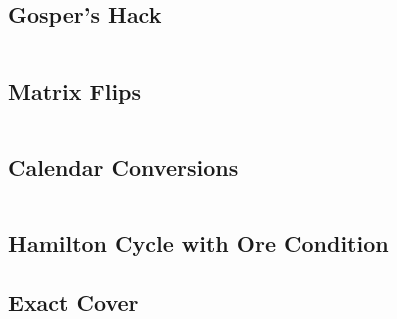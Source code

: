 \subsection{Gosper's Hack}

\hrulefill \vspace{-\baselineskip}
\begin{multicols}{2}
\inputminted[autogobble,fontsize=\tiny]{C++}{Misc/gospers_hack.cpp}
\end{multicols}
\vspace{-\baselineskip}
\noindent \hrulefill

\subsection{Matrix Flips}

\hrulefill \vspace{-\baselineskip}
\begin{multicols}{2}
\inputminted[autogobble,fontsize=\tiny]{C++}{Misc/rotate.cpp}
\end{multicols}
\vspace{-\baselineskip}
\noindent \hrulefill

\subsection{Calendar Conversions}

\hrulefill \vspace{-\baselineskip}
\begin{multicols}{2}
\inputminted[autogobble,fontsize=\tiny]{C++}{Misc/dates.cpp}
\end{multicols}
\vspace{-\baselineskip}
\noindent \hrulefill

\subsection{Hamilton Cycle with Ore Condition}

\newpage

\subsection{Exact Cover}

\hrulefill \vspace{-\baselineskip}
\begin{multicols}{2}
\inputminted[autogobble,fontsize=\tiny]{C++}{Misc/exact_cover.cpp}
\end{multicols}
\vspace{-\baselineskip}
\noindent \hrulefill

